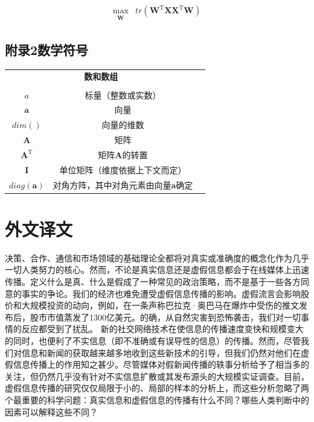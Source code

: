 \documentclass[a4paper,AutoFakeBold,oneside,12pt]{book}
\begin{document}
{{\begin{equation}
\label{PCA_goal}
\begin{aligned}
\max_{\substack{\bm{W}}}  &  tr(\bm{W}^\mathrm{T}\bm{X}\bm{X}^ \mathrm{T}\bm{W})
\end{aligned}
\end{equation}

{}
\section*{附录2\quad{}数学符号}
\begin{center}
	\begin{tabular}{ccc}
		\multicolumn{2}{c}{\textbf{数和数组}} \\
		\\
		$a$ & 标量（整数或实数）\\
		$\bm{a}$ & 向量\\
		$dim()$ & 向量的维数\\
		$\bm{A}$ & 矩阵\\
		$\bm{A}^\mathrm{T}$ & 矩阵$\textbf{A}$的转置\\
		$\bm{I}$ & 单位矩阵（维度依据上下文而定） \\
 		$diag(\bm{a})$ & 对角方阵，其中对角元素由向量$\bm{a}$确定 \\

	\end{tabular}
\end{center}

\newpage\backmatter
\chapter*{外\quad{}文\quad{}译\quad{}文}
\vspace{8mm}

\thispagestyle{empty}

\begin{center}
\sihao{}

\xiaosihao{}

\xiaosihao{}
\end{center}

\songti{}
决策、合作、通信和市场领域的基础理论全都将对真实或准确度的概念化作为几乎一切人类努力的核心。然而，不论是真实信息还是虚假信息都会于在线媒体上迅速传播。定义什么是真、什么是假成了一种常见的政治策略，而不是基于一些各方同意的事实的争论。我们的经济也难免遭受虚假信息传播的影响。虚假流言会影响股价和大规模投资的动向，例如，在一条声称巴拉克·奥巴马在爆炸中受伤的推文发布后，股市市值蒸发了1300亿美元。的确，从自然灾害到恐怖袭击，我们对一切事情的反应都受到了扰乱。
新的社交网络技术在使信息的传播速度变快和规模变大的同时，也便利了不实信息（即不准确或有误导性的信息）的传播。然而，尽管我们对信息和新闻的获取越来越多地收到这些新技术的引导，但我们仍然对他们在虚假信息传播上的作用知之甚少。尽管媒体对假新闻传播的轶事分析给予了相当多的关注，但仍然几乎没有针对不实信息扩散或其发布源头的大规模实证调查。目前，虚假信息传播的研究仅仅局限于小的、局部的样本的分析上，而这些分析忽略了两个最重要的科学问题：真实信息和虚假信息的传播有什么不同？哪些人类判断中的因素可以解释这些不同？

}}
\end{document}
